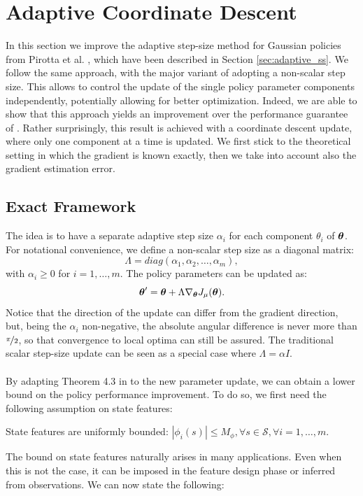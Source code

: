 \section{Adaptive Coordinate Descent}\label{sec:acd}
In this section we improve the adaptive step-size method for Gaussian policies from Pirotta et al. \cite{NIPS2013_5186}, which have been described in Section \ref{sec:adaptive_ss}. We follow the same approach, with the major variant of adopting a non-scalar step size. This allows to control the update of the single policy parameter components independently, potentially allowing for better optimization. Indeed, we are able to show that this approach yields an improvement over the performance guarantee of \cite{NIPS2013_5186}. Rather surprisingly, this result is achieved with a coordinate descent update, where only one component at a time is updated. 
We first stick to the theoretical setting in which the gradient is known exactly, then we take into account also the gradient estimation error.


\subsection{Exact Framework}
The idea is to have a separate adaptive step size $\alpha_i$ for each component $\theta_i$ of $\boldsymbol{\theta}$. For notational convenience, we define a non-scalar step size as a diagonal matrix:
\[
\Lambda=diag(\alpha_1, \alpha_2,\dotsc, \alpha_m),
\] 
with $\alpha_i \geq 0$ for $i=1,\dotsc,m$. The policy parameters can be updated as:
\[
\boldsymbol{\theta}'=\boldsymbol{\theta}+\Lambda\nabla_{\boldsymbol{\theta}}J_\mu(\boldsymbol{\theta}).
\]
Notice that the direction of the update can differ from the gradient direction, but, being the $\alpha_i$ non-negative, the absolute angular difference is never more than $\nicefrac{\pi}{2}$, so that convergence to local optima can still be assured.
The traditional scalar step-size update can be seen as a special case where $\Lambda = \alpha I$.
\paragraph{}
By adapting Theorem 4.3 in \cite{NIPS2013_5186} to the new parameter update, we can obtain a lower bound on the policy performance improvement. To do so, we first need the following assumption on state features:
\begin{assumption}\label{assum:1}
State features are uniformly bounded:
$|\phi_i(s)| \leq M_{\phi}, \forall s \in \mathcal{S}, \forall i=1,\dotsc,m$.
\end{assumption}
The bound on state features naturally arises in many applications. Even when this is not the case, it can be imposed in the feature design phase or inferred from observations. 
We can now state the following:

